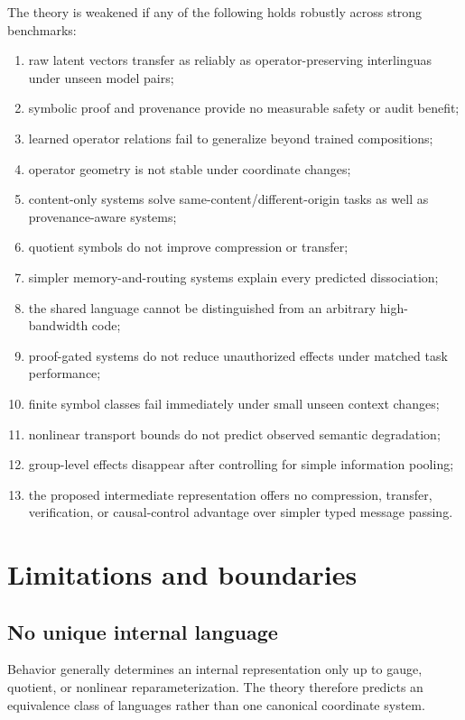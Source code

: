 \documentclass[11pt]{article}
\theoremstyle{definition}
\theoremstyle{remark}
\begin{document}
The theory is weakened if any of the following holds robustly across strong benchmarks:
\begin{enumerate}[leftmargin=1.7em]
  \item raw latent vectors transfer as reliably as operator-preserving interlinguas under unseen model pairs;
  \item symbolic proof and provenance provide no measurable safety or audit benefit;
  \item learned operator relations fail to generalize beyond trained compositions;
  \item operator geometry is not stable under coordinate changes;
  \item content-only systems solve same-content/different-origin tasks as well as provenance-aware systems;
  \item quotient symbols do not improve compression or transfer;
  \item simpler memory-and-routing systems explain every predicted dissociation;
  \item the shared language cannot be distinguished from an arbitrary high-bandwidth code;
  \item proof-gated systems do not reduce unauthorized effects under matched task performance;
  \item finite symbol classes fail immediately under small unseen context changes;
  \item nonlinear transport bounds do not predict observed semantic degradation;
  \item group-level effects disappear after controlling for simple information pooling;
  \item the proposed intermediate representation offers no compression, transfer, verification, or causal-control advantage over simpler typed message passing.
\end{enumerate}

\section{Limitations and boundaries}

\subsection{No unique internal language}

Behavior generally determines an internal representation only up to gauge, quotient, or nonlinear reparameterization. The theory therefore predicts an equivalence class of languages rather than one canonical coordinate system.
\end{document}
